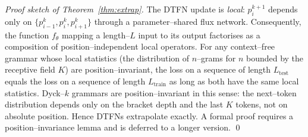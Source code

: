 \documentclass[10pt]{article}
\theoremstyle{definition}
\theoremstyle{remark}
\begin{document}
\begin{proof}[Proof sketch of Theorem~\ref{thm:extrap}]
  The DTFN update is \emph{local}: $p^{k+1}_i$ depends only on
  $\{p^k_{i-1}, p^k_i, p^k_{i+1}\}$ through a parameter--shared flux
  network.  Consequently, the function $f_\theta$ mapping a length--$L$
  input to its output factorises as a composition of position--independent
  local operators.  For any context--free grammar whose local
  statistics (the distribution of $n$--grams for $n$ bounded by the
  receptive field $K$) are position--invariant, the loss on a
  sequence of length $L_{\mathrm{test}}$ equals the loss on a sequence of
  length $L_{\mathrm{train}}$ as long as both have the same local
  statistics.  Dyck--$k$ grammars are position--invariant in this
  sense: the next--token distribution depends only on the bracket
  depth and the last $K$ tokens, not on absolute position.  Hence
  DTFNs extrapolate exactly.  A formal proof requires a
  position--invariance lemma and is deferred to a longer version.
  \qed
\end{proof}
\end{document}

